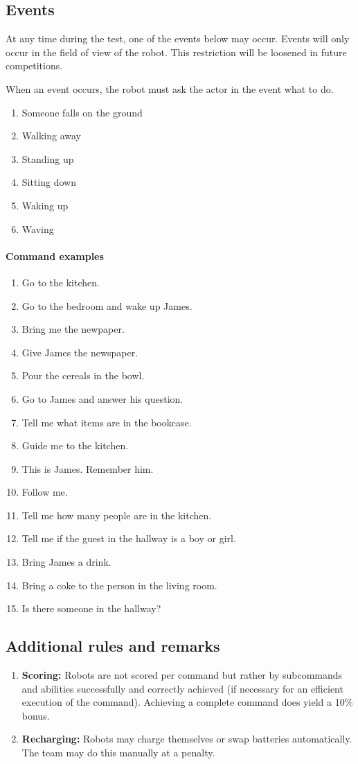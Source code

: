 \subsection{Events}
At any time during the test, one of the events below may occur. 
Events will only occur in the field of view of the robot. 
This restriction will be loosened in future competitions. 

When an event occurs, the robot must ask the actor in the event what to do. 
\begin{enumerate}
 \item Someone falls on the ground
 \item Walking away
 \item Standing up
 \item Sitting down
 \item Waking up
 \item Waving
\end{enumerate}


\paragraph{Command examples}
\begin{enumerate}
 \item Go to the kitchen.
 \item Go to the bedroom and wake up James.
 \item Bring me the newpaper.
 \item Give James the newspaper.
 \item Pour the cereals in the bowl.
 \item Go to James and answer his question.
 \item Tell me what items are in the bookcase.
 \item Guide me to the kitchen.
 \item This is James. Remember him.
 \item Follow me.
 \item Tell me how many people are in the kitchen.
 \item Tell me if the guest in the hallway is a boy or girl.
 \item Bring James a drink.
 \item Bring a coke to the person in the living room.
 \item Is there someone in the hallway?
\end{enumerate}

\subsection{Additional rules and remarks}
\label{sec:eegpsr_remarks}
\begin{enumerate}
  \item \textbf{Scoring:} Robots are not scored per command but rather by subcommands and abilities successfully and correctly achieved (if necessary for an efficient execution of the command). 
    Achieving a complete command does yield a 10\% bonus.
  \item \textbf{Recharging:} Robots may charge themselves or swap batteries automatically. The team may do this manually at a penalty.
\end{enumerate}

